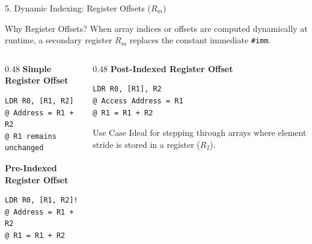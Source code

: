\documentclass[aspectratio=169,10pt]{beamer}
\begin{document}
\begin{frame}[fragile]{5. Dynamic Indexing: Register Offsets ($R_m$)}
  \begin{block}{Why Register Offsets?}
    When array indices or offsets are computed dynamically at runtime, a secondary register $R_m$ replaces the constant immediate \texttt{\#imm}.
  \end{block}

  \vspace{0.2cm}
  \begin{columns}[T]
    \begin{column}{0.48\textwidth}
      \textbf{Simple Register Offset}
      \begin{lstlisting}
LDR R0, [R1, R2]
@ Address = R1 + R2
@ R1 remains unchanged
      \end{lstlisting}

      \vspace{0.2cm}
      \textbf{Pre-Indexed Register Offset}
      \begin{lstlisting}
LDR R0, [R1, R2]!
@ Address = R1 + R2
@ R1 = R1 + R2
      \end{lstlisting}
    \end{column}

    \begin{column}{0.48\textwidth}
      \textbf{Post-Indexed Register Offset}
      \begin{lstlisting}
LDR R0, [R1], R2
@ Access Address = R1
@ R1 = R1 + R2
      \end{lstlisting}

      \vspace{0.2cm}
      \begin{exampleblock}{Use Case}
        Ideal for stepping through arrays where element stride is stored in a register ($R_2$).
      \end{exampleblock}
    \end{column}
  \end{columns}
\end{frame}
\end{document}
